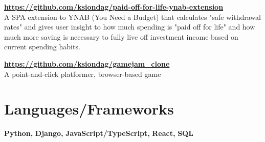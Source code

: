 \documentclass{res}
\begin{document}
\begin{resume}
   \vspace{-5pt}
   {\bf \url{https://github.com/ksiondag/paid-off-for-life-ynab-extension}}\\ A
   SPA extension to YNAB (You Need a Budget) that calculates "safe withdrawal
   rates" and gives user insight to how much spending is "paid off for life"
   and how much more saving is necessary to fully live off investment income
   based on current spending habits.
  
  
  \vspace{-5pt}
  {\bf \url{https://github.com/ksiondag/gamejam_clone}}\\
  A point-and-click platformer, browser-based game
  
  
  
  \section{Languages/Frameworks}
  \vspace{0.1in}
  {\bf Python,}
  {\bf Django,}
  {\bf JavaScript/TypeScript,}
  {\bf React,}
  {\bf SQL}
  
\end{resume}
\end{document}
